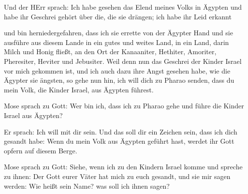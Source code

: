 Und der HErr sprach: Ich habe gesehen das Elend meines
Volks in Ägypten und habe ihr Geschrei gehört über die, die sie drängen;
ich habe ihr Leid erkannt

 und bin herniedergefahren, dass ich sie errette von der
Ägypter Hand und sie ausführe aus diesem Lande in ein gutes und weites
Land, in ein Land, darin Milch und Honig fließt, an den Ort der
Kanaaniter, Hethiter, Amoriter, Pheresiter, Heviter und Jebusiter.
 Weil denn nun das Geschrei der Kinder Israel vor mich
gekommen ist, und ich auch dazu ihre Angst gesehen habe, wie die Ägypter
sie ängsten,  so gehe nun hin, ich will dich zu Pharao
senden, dass du mein Volk, die Kinder Israel, aus Ägypten führest.

 Mose sprach zu Gott: Wer bin ich, dass ich zu Pharao gehe
und führe die Kinder Israel aus Ägypten?

 Er sprach: Ich will mit dir sein. Und das soll dir ein
Zeichen sein, dass ich dich gesandt habe: Wenn du mein Volk aus Ägypten
geführt hast, werdet ihr Gott opfern auf diesem Berge.

 Mose sprach zu Gott: Siehe, wenn ich zu den Kindern Israel
komme und spreche zu ihnen: Der Gott eurer Väter hat mich zu euch
gesandt, und sie mir sagen werden: Wie heißt sein Name? was soll ich
ihnen sagen?

